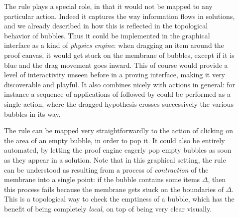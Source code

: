 \begin{description}
  \item[\textbf{\flow}]
    The {} rule plays a special role, in that it would not be mapped
    to any particular action. Indeed it captures the way information flows in
    solutions, and we already described in  how this is
    reflected in the topological behavior of bubbles. Thus it could be
    implemented in the graphical interface as a kind of \emph{physics engine}:
    when dragging an item around the proof canvas, it would get stuck on the
    membrane of bubbles, except if it is blue and the drag movement goes inward.
    This of course would provide a level of interactivity unseen before in a
    proving interface, making it very discoverable and playful. It also combines
    nicely with  actions in general: for instance a sequence of applications
    of {} followed by {} could be performed as
    a single  action, where the dragged hypothesis crosses successively the
    various bubbles in its way.
  \item[\textbf{\membrane}]
    The {} rule can be mapped very straightforwardly to the action of
    clicking on the area of an empty bubble, in order to pop it. It could also
    be entirely automated, by letting the proof engine eagerly pop empty bubbles
    as soon as they appear in a solution. Note that in this graphical setting,
    the {} rule can be understood as resulting from a process of
    \emph{contraction} of the membrane into a single point: if the bubble
    contains some items $\Delta$, then this process fails because the membrane
    gets stuck on the boundaries of $\Delta$. This is a topological way to check
    the emptiness of a bubble, which has the benefit of being completely
    \emph{local}, on top of being very clear visually.
  \item[\textbf{\resource}]

\end{description}
